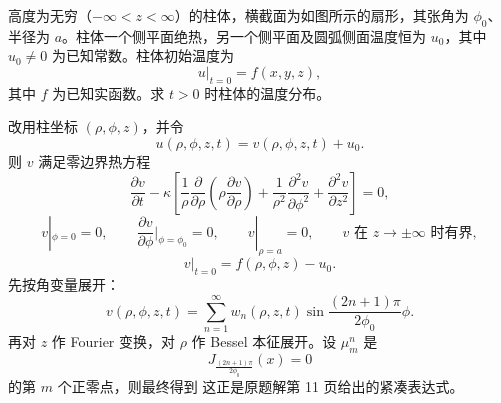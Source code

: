\begin{question}[20分]

高度为无穷（$-\infty<z<\infty$）的柱体，横截面为如图所示的扇形，其张角为 $\phi_0$、半径为 $a$。柱体一个侧平面绝热，另一个侧平面及圆弧侧面温度恒为 $u_0$，其中 $u_0\ne 0$ 为已知常数。柱体初始温度为
\[
u|_{t=0}=f(x,y,z),
\]
其中 $f$ 为已知实函数。求 $t>0$ 时柱体的温度分布。

\begin{solution}

改用柱坐标 $(\rho,\phi,z)$，并令
\[
u(\rho,\phi,z,t)=v(\rho,\phi,z,t)+u_0.
\]
则 $v$ 满足零边界热方程
\[
\frac{\partial v}{\partial t}-\kappa\left[\frac1\rho\frac\partial{\partial\rho}\left(\rho\frac{\partial v}{\partial\rho}\right)+\frac1{\rho^2}\frac{\partial^2v}{\partial\phi^2}+\frac{\partial^2v}{\partial z^2}\right]=0,
\]
\[
v|_{\phi=0}=0,
\qquad \frac{\partial v}{\partial\phi}\Big|_{\phi=\phi_0}=0,
\qquad v|_{\rho=a}=0,
\qquad v \text{ 在 } z\to\pm\infty \text{ 时有界},
\]
\[
v|_{t=0}=f(\rho,\phi,z)-u_0.
\]
先按角变量展开：
\[
v(\rho,\phi,z,t)=\sum_{n=1}^{\infty}w_n(\rho,z,t)\sin\frac{(2n+1)\pi}{2\phi_0}\phi.
\]
再对 $z$ 作 Fourier 变换，对 $\rho$ 作 Bessel 本征展开。设 $\mu_m^n$ 是
\[
J_{\frac{(2n+1)\pi}{2\phi_0}}(x)=0
\]
的第 $m$ 个正零点，则最终得到
这正是原题解第 11 页给出的紧凑表达式。

\end{solution}
\end{question}

